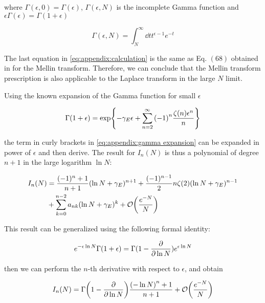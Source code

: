 \documentclass[../main.tex]{subfiles}
\begin{document}
where $\Gamma(\epsilon,0) = \Gamma(\epsilon)$, $\Gamma(\epsilon,N)$ is the incomplete Gamma function and $\epsilon \Gamma(\epsilon)=\Gamma(1+\epsilon)$

\begin{equation}
    \Gamma(\epsilon,N) = \int_N^\infty \dd{t} t^{\epsilon-1} e^{-t}
\end{equation}

The last equation in \cref{eq:appendix:calculation} is the same as Eq. $(68)$ obtained in \cite{Catani_2003_appendix} for the Mellin transform. Therefore, 
we can conclude that the Mellin transform prescription is also applicable to the Laplace transform in the large $N$ limit.

Using the known expansion of the Gamma function for small $\epsilon$ 

\begin{equation}\label{eq:appendix:gamma expansion}
    \Gamma(1+\epsilon) = \exp{-\gamma_E \epsilon + \sum_{n=2}^\infty \qty(-1)^n \frac{\zeta(n) \epsilon^n}{n}}
\end{equation}

the term in curly brackets in \cref{eq:appendix:gamma expansion} can be expanded in power of $\epsilon$ and then derive. The result for $I_n(N)$ is thus a 
polynomial of degree $n+1$ in the large logarithm $\ln N$:

\begin{align}
    \begin{split}\label{eq:appendix:In expansion}    
        I_n(N) &= \frac{(-1)^n+1}{n+1} (\ln N + \gamma_E)^{n+1} + \frac{(-1)^{n-1}}{2} n \zeta(2) (\ln N + \gamma_E)^{n-1} \\
        &+ \sum_{k=0}^{n-2} a_{nk} (\ln N + \gamma_E)^k + \order{\frac{e^{-N}}{N}}
    \end{split}
\end{align}

This result can be generalized using the following formal identity:

\begin{equation}
    e^{-\epsilon \ln N} \Gamma(1+\epsilon) = \Gamma(1- \pdv{\ln N}) e^{\epsilon \ln N }
\end{equation}

then we can perform the $n$-th derivative with respect to $\epsilon$, and obtain

\begin{equation}
    I_n(N) = \Gamma\qty(1-\pdv{\ln N}) \frac{ \qty(-\ln N)^n+1}{n+1} + \order{\frac{e^{-N}}{N}}
\end{equation}
\end{document}
